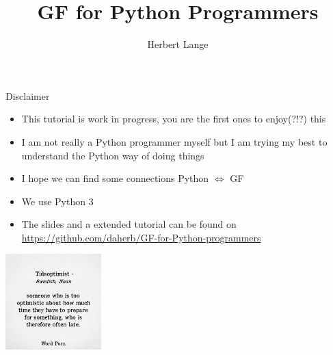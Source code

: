 \documentclass{beamer}
\title{GF for Python Programmers}
\author{Herbert Lange}
\begin{document}
\begin{frame}
  \maketitle
\end{frame}
\begin{frame}{Disclaimer}
  \begin{itemize}
  \item This tutorial is work in progress, you are the first ones to enjoy(?!?) this
  \item I am not really a Python programmer myself but I am trying my best to understand the Python way of doing things
  \item I hope we can find some connections Python $\Leftrightarrow$ GF
  \item We use Python 3
  \item The slides and a extended tutorial can be found on \url{https://github.com/daherb/GF-for-Python-programmers}
  \end{itemize}
  \begin{center}
    \includegraphics[height=10em]{tidsoptimist}
  \end{center}
\end{frame}
\end{document}
